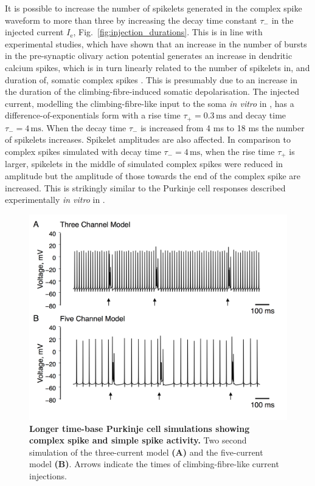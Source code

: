 \documentclass[twocolumn]{svjour3}          %
\newcommand{\mse}{\,\mathrm{ms}}
\begin{document}
It is possible to increase the number of spikelets generated in the
complex spike waveform to more than three by increasing the decay time
constant $\tau_-$ in the injected current $I_{\mathrm{e}}$,
Fig.~\ref{fig:injection_durations}. This is in line with experimental
studies, which have shown that an increase in the number of bursts in
the pre-synaptic olivary action potential generates an increase in
dendritic calcium spikes, which is in turn linearly related to the
number of spikelets in, and duration of, somatic complex spikes
\citep{MathyEtAl2009}. This is presumably due to an increase in the
duration of the climbing-fibre-induced somatic depolarisation.  The
injected current, modelling the climbing-fibre-like input to the soma
\textsl{in vitro} in \citet{DavieEtAl2008}, has a
difference-of-exponentials form with a rise time $\tau_+=0.3\mse$ and
decay time $\tau_-=4\mse$. When the decay time $\tau_-$ is increased
from 4 ms to 18 ms the number of spikelets increases. Spikelet
amplitudes are also affected. In comparison to complex spikes
simulated with decay time $\tau_- = 4\mse$, when the rise time
$\tau_+$ is larger, spikelets in the middle of simulated complex
spikes were reduced in amplitude but the amplitude of those towards
the end of the complex spike are increased.  This is strikingly
similar to the Purkinje cell responses described experimentally
\textsl{in vitro} in \citet{MonsivaisEtAl2005}.



\begin{figure}[!ht]
  \includegraphics[width=\linewidth]{Figure5.png}
\caption{\textbf{Longer time-base Purkinje cell simulations showing
    complex spike and simple spike activity.} Two second simulation of
  the three-current model \textbf{(A)} and the five-current model
    \textbf{(B)}. Arrows indicate the times of climbing-fibre-like
    current injections.}
\label{fig:long_time_base}
\end{figure}
\end{document}
